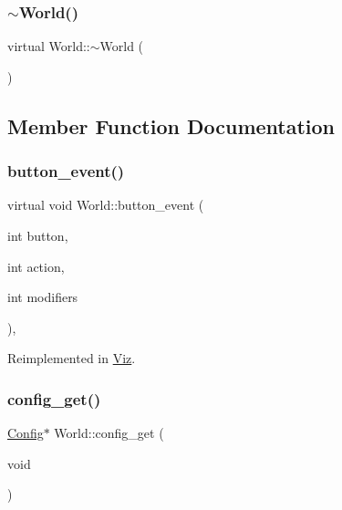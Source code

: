 \mbox{\label{classWorld_a9ce9875f5e35e293661857e4a2c1d2e4}} 
\subsubsection{\texorpdfstring{$\sim$\+World()}{~World()}}
{\footnotesize\ttfamily virtual World\+::$\sim$\+World (\begin{DoxyParamCaption}{ }\end{DoxyParamCaption})\hspace{0.3cm}{\ttfamily [virtual]}}



\subsection{Member Function Documentation}
\mbox{\label{classWorld_adea3d936b96e1bef8eb07b6462cab236}} 
\subsubsection{\texorpdfstring{button\+\_\+event()}{button\_event()}}
{\footnotesize\ttfamily virtual void World\+::button\+\_\+event (\begin{DoxyParamCaption}\item[{int}]{button,  }\item[{int}]{action,  }\item[{int}]{modifiers }\end{DoxyParamCaption})\hspace{0.3cm}{\ttfamily [protected]}, {\ttfamily [virtual]}}



Reimplemented in \mbox{\hyperlink{classViz_aaf5e987b9e03579f26bf86256ff7dcfd}{Viz}}.

\mbox{\label{classWorld_a4a9bea32a941252d8148a3c383c42562}} 
\subsubsection{\texorpdfstring{config\+\_\+get()}{config\_get()}}
{\footnotesize\ttfamily \mbox{\hyperlink{classConfig}{Config}}$\ast$ World\+::config\+\_\+get (\begin{DoxyParamCaption}\item[{void}]{ }\end{DoxyParamCaption})}

